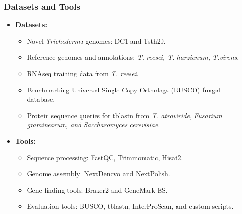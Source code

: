 \documentclass[t]{beamer}
\begin{document}
\begin{frame}
	\frametitle{Datasets and Tools}
	\begin{itemize}
		\item \textbf{Datasets:}
		\begin{itemize}
			\item Novel \textit{Trichoderma} genomes: DC1 and Tsth20.
			\item Reference genomes and annotations: \textit{T. reesei, T. harzianum, T.virens}.
			\item RNAseq training data from \textit{T. reesei}. 
			\item Benchmarking Universal Single-Copy Orthologs (BUSCO) fungal database.
			\item Protein sequence queries for tblastn from \textit{T. atroviride, Fusarium graminearum, and Saccharomyces cerevisiae}.	
		\end{itemize}
		\item \textbf{Tools:}
		\begin{itemize}
			\item Sequence processing: FastQC, Trimmomatic, Hisat2.
			\item Genome assembly: NextDenovo and NextPolish.
			\item Gene finding tools: Braker2 and GeneMark-ES.
			\item Evaluation tools: BUSCO, tblastn, InterProScan, and custom scripts.
		\end{itemize}
	\end{itemize}
\end{frame}
\end{document}
